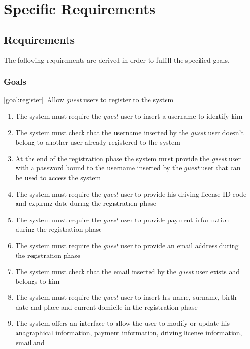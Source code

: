\section{Specific Requirements}

\subsection{Requirements}
The following requirements are derived in order to fulfill the specified goals.
\subsubsection{Goals}
	\begin{description}
		\item \ref{goal:register}\ Allow \emph{guest} users to register to the system
			\begin{enumerate}[label=\textbf{R\arabic*}]
  				\item The system must require the \emph{guest} user to insert a username to identify him
   				\item The system must check that the username inserted by the  \emph{guest} user
   				doesn't belong to another user already registered to the system 
   				\item At the end of the registration phase the system must provide the  \emph{guest}
   				user with a password bound to the username inserted by the  \emph{guest} user that can
   				be used to access the system
   				\item The system must require the  \emph{guest} user to provide his driving license ID
   				code and expiring date during the registration phase
   				\item The system must require the  \emph{guest} user to provide payment information
   				during the registration phase
   				\item The system must require the  \emph{guest} user to provide an email address during
   				the	registration phase
   				\item The system must check that the email inserted by the  \emph{guest} user exists
   				and belongs to him
   				\item The system must require the  \emph{guest} user to insert his name, surname,
   				birth date and place and current domicile in the registration phase
   				\item The system offers an interface to allow the user to modify or update his
   				anagraphical information, payment information, driving license information, email and

\end{enumerate}
\end{description}
